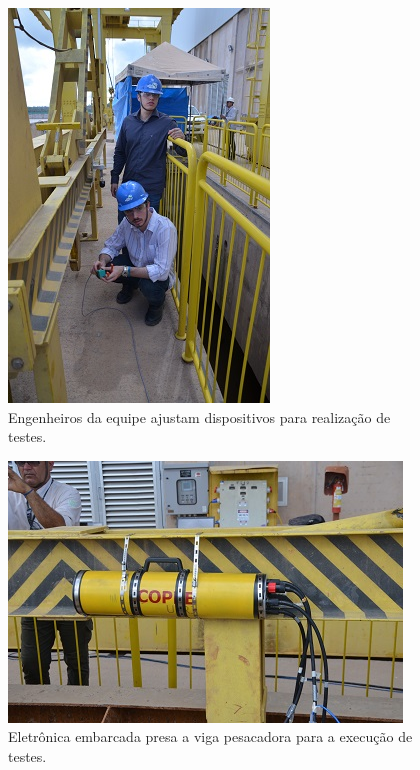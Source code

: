 
\begin{figure}[h!]
  \centering
  \includegraphics[width=1\linewidth]{Fotos/JirauJunho2014/8.JPG}
  \caption{Engenheiros da equipe ajustam dispositivos para realização de
  testes.}
  \label{jun20143}
\end{figure}

\begin{figure}[h!]
  \centering
  \includegraphics[width=1\linewidth]{Fotos/JirauJunho2014/10.JPG}
  \caption{Eletrônica embarcada presa a viga pesacadora para a execução de
  testes.}
  \label{jun20144}
\end{figure}